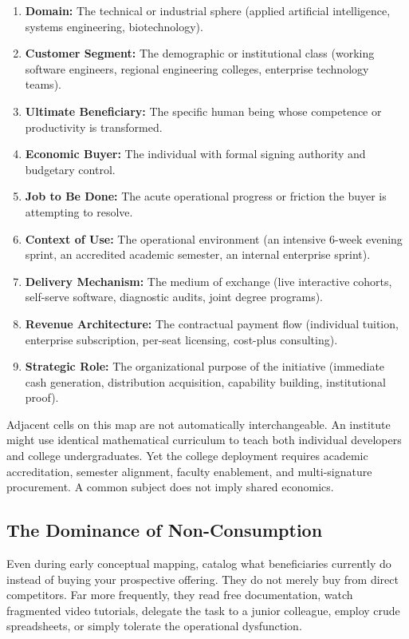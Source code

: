 \begin{enumerate}[leftmargin=12pt,itemsep=2pt,topsep=1pt,parsep=0pt]
  \item \textbf{Domain:} The technical or industrial sphere (applied artificial intelligence, systems engineering, biotechnology).
  \item \textbf{Customer Segment:} The demographic or institutional class (working software engineers, regional engineering colleges, enterprise technology teams).
  \item \textbf{Ultimate Beneficiary:} The specific human being whose competence or productivity is transformed.
  \item \textbf{Economic Buyer:} The individual with formal signing authority and budgetary control.
  \item \textbf{Job to Be Done:} The acute operational progress or friction the buyer is attempting to resolve.
  \item \textbf{Context of Use:} The operational environment (an intensive 6-week evening sprint, an accredited academic semester, an internal enterprise sprint).
  \item \textbf{Delivery Mechanism:} The medium of exchange (live interactive cohorts, self-serve software, diagnostic audits, joint degree programs).
  \item \textbf{Revenue Architecture:} The contractual payment flow (individual tuition, enterprise subscription, per-seat licensing, cost-plus consulting).
  \item \textbf{Strategic Role:} The organizational purpose of the initiative (immediate cash generation, distribution acquisition, capability building, institutional proof).
\end{enumerate}

Adjacent cells on this map are not automatically interchangeable. An institute might use identical mathematical curriculum to teach both individual developers and college undergraduates. Yet the college deployment requires academic accreditation, semester alignment, faculty enablement, and multi-signature procurement. A common subject does not imply shared economics.

\subsection{The Dominance of Non-Consumption}

Even during early conceptual mapping, catalog what beneficiaries currently do instead of buying your prospective offering. They do not merely buy from direct competitors. Far more frequently, they read free documentation, watch fragmented video tutorials, delegate the task to a junior colleague, employ crude spreadsheets, or simply tolerate the operational dysfunction.


